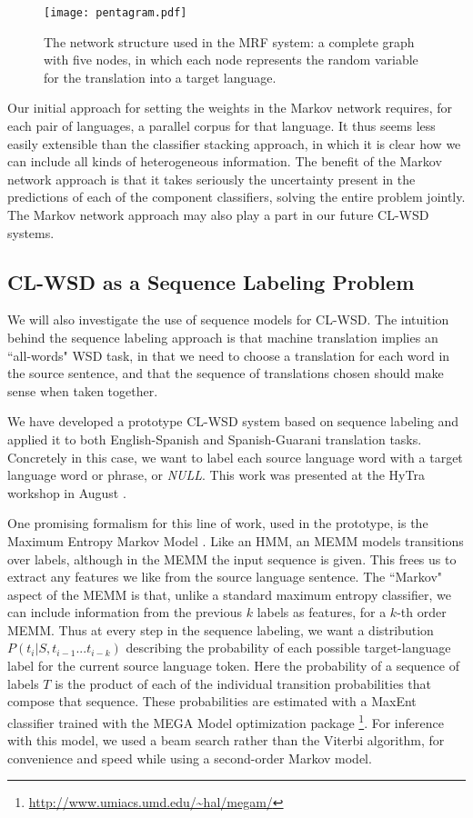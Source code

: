 \begin{figure}
  \begin{center}
  \texttt{[image: pentagram.pdf]}
  \end{center}
  \caption{The network structure used in the MRF system: a complete graph with
  five nodes, in which each node represents the random variable for the
  translation into a target language.}
  \label{fig:pentagram}
\end{figure}

Our initial approach for setting the weights in the Markov network requires,
for each pair of languages, a parallel corpus for that language. It thus seems
less easily extensible than the classifier stacking approach, in which it is
clear how we can include all kinds of heterogeneous information.
The benefit of the Markov network approach is that it takes seriously the
uncertainty present in the predictions of each of the component classifiers,
solving the entire problem jointly.
The Markov network approach may also play a part in our future CL-WSD systems.

\subsection{CL-WSD as a Sequence Labeling Problem}
We will also investigate the use of sequence models for CL-WSD.
The intuition behind the sequence labeling approach is that machine translation
implies an ``all-words" WSD task, in that we need to choose a translation for
each word in the source sentence, and that the sequence of translations chosen
should make sense when taken together.

We have developed a prototype CL-WSD system based on sequence labeling and
applied it to both English-Spanish and Spanish-Guarani translation tasks.
Concretely in this case, we want to label each source language word with a
target language word or phrase, or \emph{NULL}.
This work was presented at the HyTra workshop in August
\cite{rudnick-gasser:2013:HyTra-2013}.

One promising formalism for this line of work, used in the prototype, is the
Maximum Entropy Markov Model \cite{icml00/mccallum}.
Like an HMM, an MEMM models transitions over labels, although in the MEMM the
input sequence is given.
This frees us to extract any features we like from the source language
sentence. The ``Markov" aspect of the MEMM is that, unlike a standard maximum
entropy classifier, we can include information from the previous $k$ labels as
features, for a $k$-th order MEMM.
Thus at every step in the sequence labeling, we want a distribution
$P(t_i | S, t_{i-1}...t_{i-k})$ describing the probability of each possible
target-language label for the current source language token.
Here the probability of a sequence of labels $T$ is the product of each of the
individual transition probabilities that compose that sequence.
These probabilities are estimated with a MaxEnt classifier trained with 
the MEGA Model optimization package
\footnote{\url{http://www.umiacs.umd.edu/~hal/megam/}}.
For inference with this model, we used a beam search rather than the Viterbi
algorithm, for convenience and speed while using a second-order Markov model.

